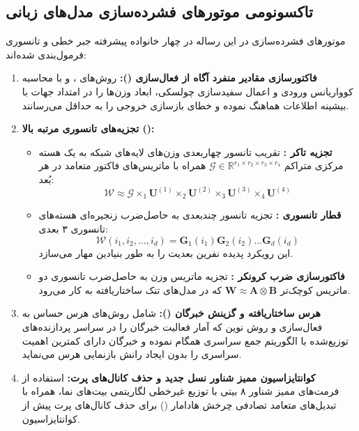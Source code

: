 \documentclass[12pt,a4paper]{report}
\theoremstyle{definition}
\begin{document}
\subsection{تاکسونومی موتورهای فشرده‌سازی مدل‌های زبانی}
\label{sec:compression_taxonomy}
موتورهای فشرده‌سازی در این رساله در چهار خانواده پیشرفته جبر خطی و تانسوری فرمول‌بندی شده‌اند:
\begin{enumerate}
    \item \textbf{فاکتورسازی مقادیر منفرد آگاه از فعال‌سازی ():} روش‌های ،  و  با محاسبه کوواریانس ورودی و اعمال سفیدسازی چولسکی، ابعاد وزن‌ها را در امتداد جهات با بیشینه اطلاعات هماهنگ نموده و خطای بازسازی خروجی را به حداقل می‌رسانند.
    \item \textbf{تجزیه‌های تانسوری مرتبه بالا ():}
    \begin{itemize}
        \item \textbf{تجزیه تاکر :} تقریب تانسور چهاربعدی وزن‌های لایه‌های شبکه به یک هسته مرکزی متراکم $\mathcal{G} \in \mathbb{R}^{r_1 \times r_2 \times r_3 \times r_4}$ همراه با ماتریس‌های فاکتور متعامد در هر بُعد:
        \begin{equation}
        \mathcal{W} \approx \mathcal{G} \times_1 \mathbf{U}^{(1)} \times_2 \mathbf{U}^{(2)} \times_3 \mathbf{U}^{(3)} \times_4 \mathbf{U}^{(4)}
        \end{equation}
        \item \textbf{قطار تانسوری :} تجزیه تانسور چندبعدی به حاصل‌ضرب زنجیره‌ای هسته‌های تانسوری ۳ بعدی:
        \begin{equation}
        \mathcal{W}(i_1, i_2, \dots, i_d) = \mathbf{G}_1(i_1) \mathbf{G}_2(i_2) \dots \mathbf{G}_d(i_d)
        \end{equation}
        این رویکرد پدیده نفرین بعدیت  را به طور بنیادین مهار می‌سازد.
        \item \textbf{فاکتورسازی ضرب کرونکر :} تجزیه ماتریس وزن به حاصل‌ضرب تانسوری دو ماتریس کوچک‌تر $\mathbf{W} \approx \mathbf{A} \otimes \mathbf{B}$ که در مدل‌های تنک ساختاریافته به کار می‌رود.
    \end{itemize}
    \item \textbf{هرس ساختاریافته و گزینش خبرگان ():} شامل روش‌های هرس حساس به فعال‌سازی  و روش نوین  که آمار فعالیت خبرگان را در سراسر پردازنده‌های توزیع‌شده با الگوریتم جمع سراسری  همگام نموده و خبرگان دارای کمترین اهمیت سراسری را بدون ایجاد رانش بازنمایی هرس می‌نماید.
    \item \textbf{کوانتایزاسیون ممیز شناور نسل جدید  و حذف کانال‌های پرت:} استفاده از فرمت‌های ممیز شناور ۸ بیتی  با توزیع غیرخطی لگاریتمی بیت‌های نما، همراه با تبدیل‌های متعامد تصادفی چرخش هادامار () برای حذف کانال‌های پرت پیش از کوانتایزاسیون.
\end{enumerate}
\end{document}
